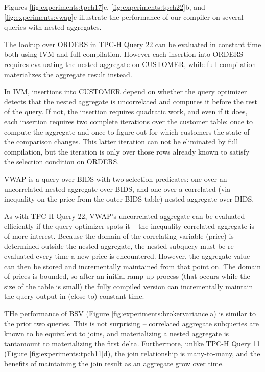 Figures \ref{fig:experiments:tpch17}c, \ref{fig:experiments:tpch22}b, and \ref{fig:experiments:vwap}c illustrate the performance of our compiler on several queries with nested aggregates.

The lookup over ORDERS in TPC-H Query 22 can be evaluated in constant time both using IVM and full compilation.  However each insertion into ORDERS requires evaluating the nested aggregate on CUSTOMER, while full compilation materializes the aggregate result instead.

In IVM, insertions into CUSTOMER depend on whether the query optimizer detects that the nested aggregate is uncorrelated and computes it before the rest of the query.  If not, the insertion requires quadratic work, and even if it does, each insertion requires two complete iterations over the customer table: once to compute the aggregate and once to figure out for which customers the state of the comparison changes.  This latter iteration can not be eliminated by full compilation, but the iteration is only over those rows already known to satisfy the selection condition on ORDERS.

VWAP is a query over BIDS with two selection predicates: one over an uncorrelated nested aggregate over BIDS, and one over a correlated (via inequality on the price from the outer BIDS table) nested aggregate over BIDS.  

As with TPC-H Query 22, VWAP's uncorrelated aggregate can be evaluated efficiently if the query optimizer spots it -- the inequality-correlated aggregate is of more interest.  Because the domain of the correlating variable (price) is determined outside the nested aggregate, the nested subquery must be re-evaluated every time a new price is encountered.  However, the aggregate value can then be stored and incrementally maintained from that point on.  The domain of prices is bounded, so after an initial ramp up process (that occurs while the size of the table is small) the fully compiled version can incrementally maintain the query output in (close to) constant time.

THe performance of BSV (Figure \ref{fig:experiments:brokervariance}a) is similar to the prior two queries.  This is not surprising -- correlated aggregate subqueries are known to be equivalent to joins, and materializing a nested aggregate is tantamount to materializing the first delta.  Furthermore, unlike TPC-H Query 11 (Figure \ref{fig:experiments:tpch11}d), the join relationship is many-to-many, and the benefits of maintaining the join result as an aggregate grow over time.

